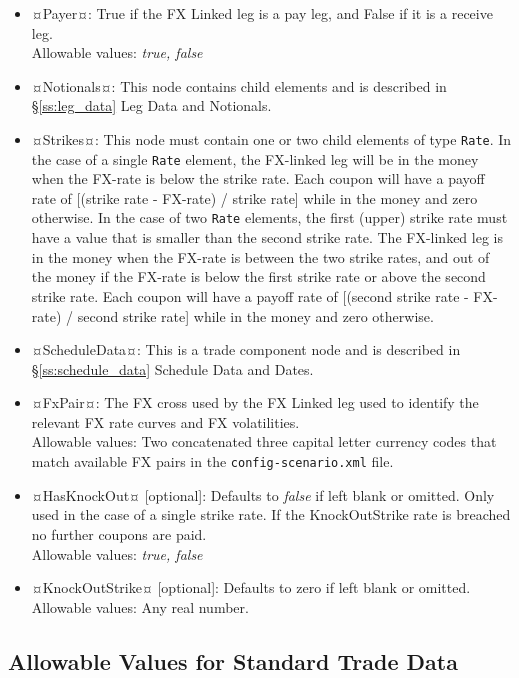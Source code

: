 \begin{itemize}
\item ¤Payer¤: True if the FX Linked leg is a pay leg, and False if it is a receive leg. \\ Allowable values:  \emph{true, false}
\item ¤Notionals¤: This node contains child elements and is described in \S \ref{ss:leg_data} Leg Data and Notionals. 
\item ¤Strikes¤: This node must contain one or two child elements of type \lstinline!Rate!.  In the case of a single \lstinline!Rate! element, the FX-linked leg will be in the money when the FX-rate is below the strike rate.   Each coupon will have a payoff rate of [(strike rate - FX-rate) / strike rate] while in the money and zero otherwise.  
In the case of two \lstinline!Rate! elements, the first (upper) strike rate must have a value that is smaller than the second strike rate.  The FX-linked leg is in the money when the FX-rate is between the two strike rates, and out of the money if the FX-rate is below the first strike rate or above the second strike rate.    Each coupon will have a payoff rate of [(second strike rate - FX-rate) / second strike rate] while in the money and zero otherwise.  

\item ¤ScheduleData¤: This is a trade component node and is described in \S \ref{ss:schedule_data} Schedule Data and Dates.   
\item ¤FxPair¤: The FX cross used by the FX Linked leg used to identify the relevant FX rate curves and FX volatilities. \\ Allowable values:  Two concatenated three capital letter currency codes that match available FX pairs in the {\tt config-scenario.xml} file.
\item ¤HasKnockOut¤ [optional]: Defaults to \emph{false} if left blank or omitted. Only used in the case of a single strike rate. If the KnockOutStrike rate is breached no further coupons are paid. \\ Allowable values:  \emph{true, false}
\item ¤KnockOutStrike¤ [optional]: Defaults to zero if left blank or omitted. \\ Allowable values:  Any real number.


\end{itemize}

\subsection{Allowable Values for Standard Trade Data}

